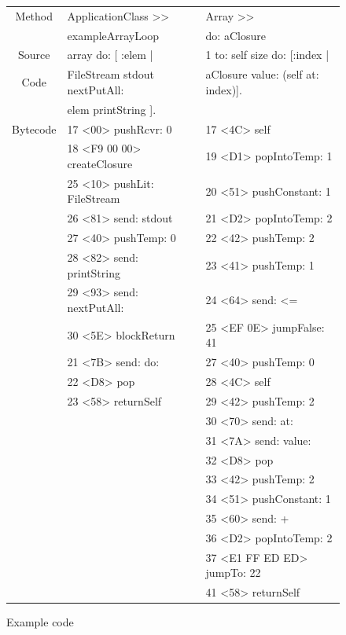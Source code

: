 \documentclass[a4paper,12pt,twoside]{../includes/ThesisStyle}
\begin{document}
\begin{figure}
    \begin{center}
		\noindent \begin{tabular}{@{}c|l|l@{}}
		Method & ApplicationClass >> & Array >> \\
		 & exampleArrayLoop & do: aClosure \\
		\midrule
		Source &  array do: [ :elem | & 1 to: self size do: [:index | \\
		Code &\hspace{0.3cm}FileStream stdout nextPutAll: &\hspace{0.3cm}aClosure value: (self at: index)]. \\
		 &\hspace{0.6cm}elem printString ]. &  \\
		\midrule
		Bytecode &  17 <00> pushRcvr: 0 & 17 <4C> self \\
		& 18 <F9 00 00> createClosure & 19 <D1> popIntoTemp: 1 \\
		& 	        25 <10> pushLit: FileStream & 	20 <51> pushConstant: 1 \\
		& 	        26 <81> send: stdout & 	21 <D2> popIntoTemp: 2 \\
		& 	        27 <40> pushTemp: 0 & 	22 <42> pushTemp: 2 \\
		& 	        28 <82> send: printString & 	23 <41> pushTemp: 1 \\
		& 	        29 <93> send: nextPutAll: & 	24 <64> send: <= \\
		& 	        30 <5E> blockReturn & 	25 <EF 0E> jumpFalse: 41 \\
		& 	21 <7B> send: do: & 	27 <40> pushTemp: 0 \\
		& 	22 <D8> pop & 	28 <4C> self \\
		& 	23 <58> returnSelf & 	29 <42> pushTemp: 2 \\
		&  & 	30 <70> send: at: \\
		&  & 	31 <7A> send: value: \\
		&  & 	32 <D8> pop \\
		&  & 	33 <42> pushTemp: 2 \\
		&  & 	34 <51> pushConstant: 1 \\
		&  & 	35 <60> send: + \\
		&  & 	36 <D2> popIntoTemp: 2 \\
		&  & 	37 <E1 FF ED ED> jumpTo: 22 \\
		&  & 	41 <58> returnSelf \\
		\end{tabular}
	\caption{Example code}
    \label{fig:ExampleCode}
    \end{center}
\end{figure}
\end{document}

